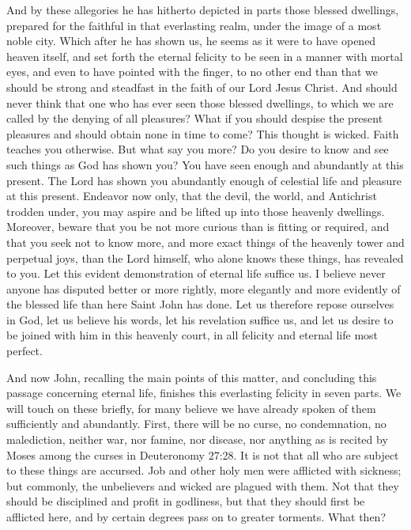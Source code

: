 And by these allegories he has hitherto depicted in parts those blessed dwellings, prepared for the faithful in that everlasting realm, under the image of a most noble city. Which after he has shown us, he seems as it were to have opened heaven itself, and set forth the eternal felicity to be seen in a manner with mortal eyes, and even to have pointed with the finger, to no other end than that we should be strong and steadfast in the faith of our Lord Jesus Christ. And should never think that one who has ever seen those blessed dwellings, to which we are called by the denying of all pleasures? What if you should despise the present pleasures and should obtain none in time to come? This thought is wicked. Faith teaches you otherwise. But what say you more? Do you desire to know and see such things as God has shown you? You have seen enough and abundantly at this present. The Lord has shown you abundantly enough of celestial life and pleasure at this present. Endeavor now only, that the devil, the world, and Antichrist trodden under, you may aspire and be lifted up into those heavenly dwellings. Moreover, beware that you be not more curious than is fitting or required, and that you seek not to know more, and more exact things of the heavenly tower and perpetual joys, than the Lord himself, who alone knows these things, has revealed to you. Let this evident demonstration of eternal life suffice us. I believe never anyone has disputed better or more rightly, more elegantly and more evidently of the blessed life than here Saint John has done. Let us therefore repose ourselves in God, let us believe his words, let his revelation suffice us, and let us desire to be joined with him in this heavenly court, in all felicity and eternal life most perfect.

And now John, recalling the main points of this matter, and concluding this passage concerning eternal life, finishes this everlasting felicity in seven parts. We will touch on these briefly, for many believe we have already spoken of them sufficiently and abundantly. First, there will be no curse, no condemnation, no malediction, neither war, nor famine, nor disease, nor anything as is recited by Moses among the curses in Deuteronomy 27:28. It is not that all who are subject to these things are accursed. Job and other holy men were afflicted with sickness; but commonly, the unbelievers and wicked are plagued with them. Not that they should be disciplined and profit in godliness, but that they should first be afflicted here, and by certain degrees pass on to greater torments. What then?

